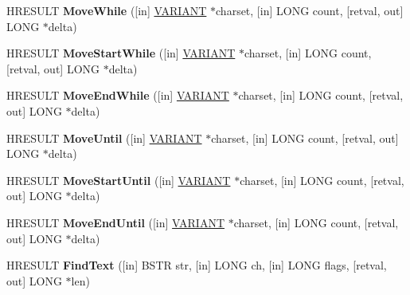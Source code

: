\begin{DoxyCompactItemize}
H\+R\+E\+S\+U\+LT {\bfseries Move\+While} (\mbox{[}in\mbox{]} \hyperlink{structtag_v_a_r_i_a_n_t}{V\+A\+R\+I\+A\+NT} $\ast$charset, \mbox{[}in\mbox{]} L\+O\+NG count, \mbox{[}retval, out\mbox{]} L\+O\+NG $\ast$delta)
\item 
\mbox{\label{interfacetom_1_1_i_text_range_aa3192a62c2c67e41d5a8c4cc1824b96e}} 
H\+R\+E\+S\+U\+LT {\bfseries Move\+Start\+While} (\mbox{[}in\mbox{]} \hyperlink{structtag_v_a_r_i_a_n_t}{V\+A\+R\+I\+A\+NT} $\ast$charset, \mbox{[}in\mbox{]} L\+O\+NG count, \mbox{[}retval, out\mbox{]} L\+O\+NG $\ast$delta)
\item 
\mbox{\label{interfacetom_1_1_i_text_range_aae6c8b696593823805257f19d1e78413}} 
H\+R\+E\+S\+U\+LT {\bfseries Move\+End\+While} (\mbox{[}in\mbox{]} \hyperlink{structtag_v_a_r_i_a_n_t}{V\+A\+R\+I\+A\+NT} $\ast$charset, \mbox{[}in\mbox{]} L\+O\+NG count, \mbox{[}retval, out\mbox{]} L\+O\+NG $\ast$delta)
\item 
\mbox{\label{interfacetom_1_1_i_text_range_ae1132dcb7c0fac8fbdde76a894f6f4de}} 
H\+R\+E\+S\+U\+LT {\bfseries Move\+Until} (\mbox{[}in\mbox{]} \hyperlink{structtag_v_a_r_i_a_n_t}{V\+A\+R\+I\+A\+NT} $\ast$charset, \mbox{[}in\mbox{]} L\+O\+NG count, \mbox{[}retval, out\mbox{]} L\+O\+NG $\ast$delta)
\item 
\mbox{\label{interfacetom_1_1_i_text_range_a43de5e72abd5a3df73b8edee68798c63}} 
H\+R\+E\+S\+U\+LT {\bfseries Move\+Start\+Until} (\mbox{[}in\mbox{]} \hyperlink{structtag_v_a_r_i_a_n_t}{V\+A\+R\+I\+A\+NT} $\ast$charset, \mbox{[}in\mbox{]} L\+O\+NG count, \mbox{[}retval, out\mbox{]} L\+O\+NG $\ast$delta)
\item 
\mbox{\label{interfacetom_1_1_i_text_range_a56cfb8229539f7accd3a6c8eecb45228}} 
H\+R\+E\+S\+U\+LT {\bfseries Move\+End\+Until} (\mbox{[}in\mbox{]} \hyperlink{structtag_v_a_r_i_a_n_t}{V\+A\+R\+I\+A\+NT} $\ast$charset, \mbox{[}in\mbox{]} L\+O\+NG count, \mbox{[}retval, out\mbox{]} L\+O\+NG $\ast$delta)
\item 
\mbox{\label{interfacetom_1_1_i_text_range_a8e2a6fee72b6e1a10d6cb130c0f7d980}} 
H\+R\+E\+S\+U\+LT {\bfseries Find\+Text} (\mbox{[}in\mbox{]} B\+S\+TR str, \mbox{[}in\mbox{]} L\+O\+NG ch, \mbox{[}in\mbox{]} L\+O\+NG flags, \mbox{[}retval, out\mbox{]} L\+O\+NG $\ast$len)

\end{DoxyCompactItemize}
